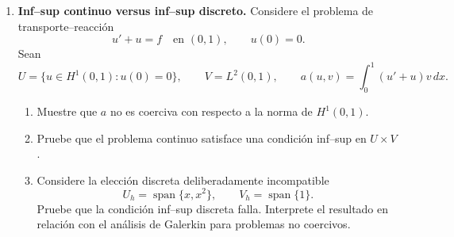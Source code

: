 \documentclass[11pt]{article}
\theoremstyle{thmstyle}
\begin{document}
\begin{enumerate}[label=\textbf{\arabic*.}, leftmargin=*]
    \item \textbf{Inf--sup continuo versus inf--sup discreto.} Considere el problema de transporte--reacci\'on
    \begin{equation*}
        u'+u=f\quad\text{en }(0,1),
        \qquad
        u(0)=0.
    \end{equation*}
    Sean
    \begin{equation*}
        U=\{u\in H^1(0,1):u(0)=0\},
        \qquad
        V=L^2(0,1),
        \qquad
        a(u,v)=\int_0^1(u'+u)v\,dx.
    \end{equation*}
    \begin{enumerate}[label=(\alph*)]
        \item Muestre que $a$ no es coerciva con respecto a la norma de $H^1(0,1)$.
        \item Pruebe que el problema continuo satisface una condici\'on inf--sup en $U\times V$.
        \item Considere la elecci\'on discreta deliberadamente incompatible
        \begin{equation*}
            U_h=\operatorname{span}\{x,x^2\},
            \qquad
            V_h=\operatorname{span}\{1\}.
        \end{equation*}
        Pruebe que la condici\'on inf--sup discreta falla. Interprete el resultado en relaci\'on con el an\'alisis de Galerkin para problemas no coercivos.
    \end{enumerate}

\end{enumerate}
\end{document}
